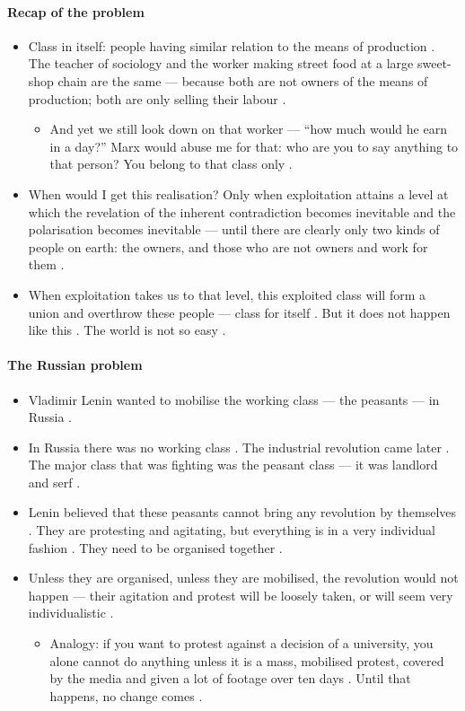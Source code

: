 \paragraph{Recap of the problem}
\begin{itemize}
    \item Class in itself: people having similar relation to the means of production . The teacher of sociology and the worker making street food at a large sweet-shop chain are the same --- because both are not owners of the means of production; both are only selling their labour .
    \begin{itemize}
        \item And yet we still look down on that worker --- ``how much would he earn in a day?''  Marx would abuse me for that: who are you to say anything to that person? You belong to that class only .
    \end{itemize}
    \item When would I get this realisation? Only when exploitation attains a level at which the revelation of the inherent contradiction becomes inevitable and the polarisation becomes inevitable --- until there are clearly only two kinds of people on earth: the owners, and those who are not owners and work for them .
    \item When exploitation takes us to that level, this exploited class will form a union and overthrow these people --- class for itself . But it does not happen like this . The world is not so easy .
\end{itemize}

\paragraph{The Russian problem}
\begin{itemize}
    \item Vladimir Lenin wanted to mobilise the working class --- the peasants --- in Russia .
    \item In Russia there was no working class . The industrial revolution came later . The major class that was fighting was the peasant class --- it was landlord and serf .
    \item Lenin believed that these peasants cannot bring any revolution by themselves . They are protesting and agitating, but everything is in a very individual fashion . They need to be organised together .
    \item Unless they are organised, unless they are mobilised, the revolution would not happen --- their agitation and protest will be loosely taken, or will seem very individualistic .
    \begin{itemize}
        \item Analogy: if you want to protest against a decision of a university, you alone cannot do anything unless it is a mass, mobilised protest, covered by the media and given a lot of footage over ten days . Until that happens, no change comes .
    \end{itemize}
\end{itemize}

